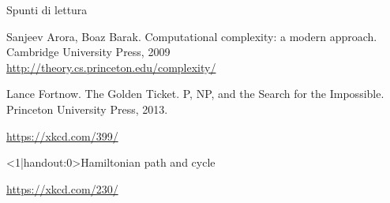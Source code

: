 \begin{frame}{Spunti di lettura}

\vspace{-9pt}
\begin{myboxtitle}[Bibliografia]
\BI
\item Sanjeev Arora, Boaz Barak. Computational complexity: a modern approach.
Cambridge University Press, 2009\\
\url{http://theory.cs.princeton.edu/complexity/}
\item  Lance Fortnow. The Golden Ticket. P, NP, and the Search for the Impossible. Princeton University Press, 2013.
\EI
\end{myboxtitle}


\vfill
\tiny
\url{https://xkcd.com/399/}

\end{frame}

\begin{frame}<1|handout:0>{Hamiltonian path and cycle}
\vspace{-12pt}
\begin{center}
\end{center}
\vfill
\tiny
\url{https://xkcd.com/230/}
\end{frame}












